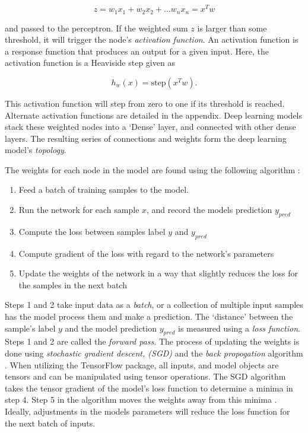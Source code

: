 		\begin{equation}
			z = w_1 x_1 + w_2 x_2 + ... w_n x_n = x^T w
		\end{equation}

		and passed to the perceptron. If the weighted sum $z$ is larger than some threshold, it will trigger the node's \textit{activation function}. An activation function is a response function that produces an output for a given input. Here, the activation function is a Heaviside step given as

		\begin{equation}\label{eq:heavy}
			h_w(x) = \textrm{step}(x^Tw).
		\end{equation}

		This activation function will step from zero to one if its threshold is reached. Alternate activation functions are detailed in the appendix. Deep learning models stack these weighted nodes into a `Dense' layer, and connected with other dense layers. The resulting series of connections and weights form the deep learning model's \textit{topology}.

		The weights for each node in the model are found using the following algorithm \cite{Chollet}:

		\begin{enumerate}
			\item Feed a batch of training samples to the model.
			\item Run the network for each sample $x$, and record the models prediction $y_{pred}$
			\item Compute the loss between samples label $y$ and $y_{pred}$
			\item Compute gradient of the loss with regard to the network's parameters
			\item Update the weights of the network in a way that slightly reduces the loss for the samples in the next batch
		\end{enumerate}

		Steps 1 and 2 take input data as a \textit{batch}, or a collection of multiple input samples has the model process them and make a prediction.  The `distance' between the sample's label $y$ and the model prediction $y_{pred}$ is measured using a \textit{loss function}. Steps 1 and 2 are called the \textit{forward pass}.	The process of updating the weights is done using \textit{stochastic gradient descent, (SGD)} and the \textit{back propogation} algorithm  \cite{BP}. When utilizing the TensorFlow package, all inputs, and model objects are tensors and can be manipulated using tensor operations. The SGD algorithm takes the tensor gradient of the model's loss function to determine a minima in step 4. Step 5 in the algorithm moves the weights away from this minima \cite{Chollet}.  Ideally, adjustments in the models parameters will reduce the loss function for the next batch of inputs.

